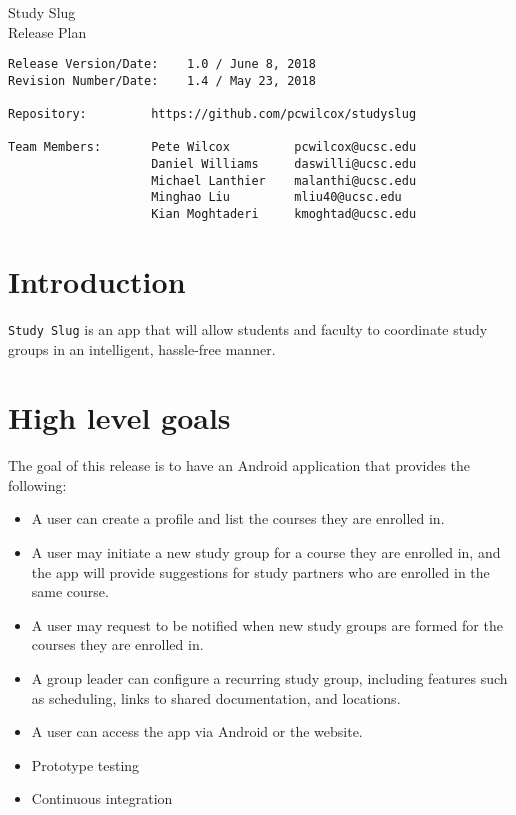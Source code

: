 \documentclass[10pt]{article}
\begin{document}
    
    \begin{center}
        \Huge{Study Slug} \\
        \Large{Release Plan}
    \end{center}
    \begin{verbatim}
Release Version/Date:    1.0 / June 8, 2018        
Revision Number/Date:    1.4 / May 23, 2018

Repository:         https://github.com/pcwilcox/studyslug

Team Members:       Pete Wilcox         pcwilcox@ucsc.edu    
                    Daniel Williams     daswilli@ucsc.edu  
                    Michael Lanthier    malanthi@ucsc.edu  
                    Minghao Liu         mliu40@ucsc.edu
                    Kian Moghtaderi     kmoghtad@ucsc.edu
    \end{verbatim}
    
    \section{Introduction}
    \texttt{Study Slug} is an app that will allow students and faculty to coordinate study groups in an intelligent, hassle-free manner.
    
    \section{High level goals}
    The goal of this release is to have an Android application that provides the following:
    \begin{itemize}
        \item A user can create a profile and list the courses they are enrolled in.
        \item A user may initiate a new study group for a course they are enrolled in, and the app will provide suggestions for study partners who are enrolled in the same course.
        \item A user may request to be notified when new study groups are formed for the courses they are enrolled in.
        \item A group leader can configure a recurring study group, including features such as scheduling, links to shared documentation, and locations.
        \item A user can access the app via Android or the website.
        \item Prototype testing
        \item Continuous integration
    \end{itemize}
    
\end{document}
